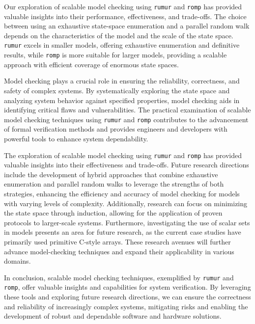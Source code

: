 Our exploration of scalable model checking using \texttt{rumur} and
\texttt{romp} has provided valuable insights into their performance,
effectiveness, and trade-offs.
The choice between using an exhaustive state-space enumeration and
a parallel random walk depends on the characteristics of the model and the
scale of the state space.
\texttt{rumur} excels in smaller models, offering exhaustive enumeration and
definitive results, while \texttt{romp} is more suitable for larger models,
providing a scalable approach with efficient coverage of enormous state spaces.

Model checking plays a crucial role in ensuring the reliability, correctness,
and safety of complex systems.
By systematically exploring the state space and analyzing system behavior
against specified properties, model checking aids in identifying critical
flaws and vulnerabilities.
The practical examination of scalable model checking techniques using
\texttt{rumur} and \texttt{romp} contributes to the advancement of
formal verification methods and provides engineers and developers with
powerful tools to enhance system dependability.

The exploration of scalable model checking using \texttt{rumur} and
\texttt{romp} has provided valuable insights into their effectiveness and
trade-offs.
Future research directions include the development of hybrid approaches that
combine exhaustive enumeration and parallel random walks to leverage the
strengths of both strategies, enhancing the efficiency and accuracy of model
checking for models with varying levels of complexity.
Additionally, research can focus on minimizing the state space through
induction, allowing for the application of proven protocols to larger-scale
systems.
Furthermore, investigating the use of scalar sets in models presents an area
for future research, as the current case studies have primarily used
primitive C-style arrays.
These research avenues will further advance model-checking techniques and
expand their applicability in various domains.

In conclusion, scalable model checking techniques, exemplified by
\texttt{rumur} and \texttt{romp}, offer valuable insights and capabilities
for system verification.
By leveraging these tools and exploring future research directions,
we can ensure the correctness and reliability of increasingly complex systems,
mitigating risks and enabling the development of robust and dependable
software and hardware solutions.

